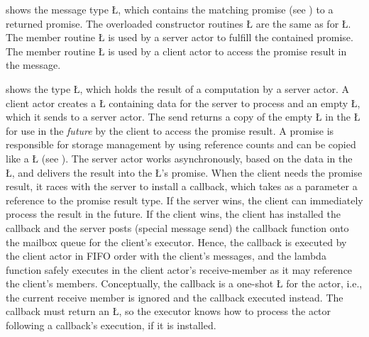 \documentclass[openright,twoside]{report}
\begin{document}
 shows the message type \LGinlinetrue\LGbegin\lgrinde\L{}\endlgrinde\LGend{}, which contains the matching promise (see ) to a returned promise.
The overloaded constructor routines \LGinlinetrue\LGbegin\lgrinde\L{}\endlgrinde\LGend{} are the same as for \LGinlinetrue\LGbegin\lgrinde\L{}\endlgrinde\LGend{}.
The member routine \LGinlinetrue\LGbegin\lgrinde\L{}\endlgrinde\LGend{} is used by a server actor to fulfill the contained promise.
The member routine \LGinlinetrue\LGbegin\lgrinde\L{}\endlgrinde\LGend{} is used by a client actor to access the promise result in the message.

 shows the type \LGinlinetrue\LGbegin\lgrinde\L{}\endlgrinde\LGend{}, which holds the result of a computation by a server actor.
A client actor creates a \LGinlinetrue\LGbegin\lgrinde\L{}\endlgrinde\LGend{} containing data for the server to process and an empty \LGinlinetrue\LGbegin\lgrinde\L{}\endlgrinde\LGend{}, which it sends to a server actor.
The send returns a copy of the empty \LGinlinetrue\LGbegin\lgrinde\L{}\endlgrinde\LGend{} in the \LGinlinetrue\LGbegin\lgrinde\L{}\endlgrinde\LGend{} for use in the \emph{future} by the client to access the promise result.
A promise is responsible for storage management by using reference counts and can be copied like a \LGinlinetrue\LGbegin\lgrinde\L{}\endlgrinde\LGend{} (see ).
The server actor works asynchronously, based on the data in the \LGinlinetrue\LGbegin\lgrinde\L{}\endlgrinde\LGend{}, and delivers the result into the \LGinlinetrue\LGbegin\lgrinde\L{}\endlgrinde\LGend{}'s promise.
When the client needs the promise result, it races with the server to install a callback, which takes as a parameter a reference to the promise result type.
If the server wins, the client can immediately process the result in the future.
If the client wins, the client has installed the callback and the server posts (special message send) the callback function onto the mailbox queue for the client's executor.
Hence, the callback is executed by the client actor in FIFO order with the client's messages, and the lambda function safely executes in the client actor's receive-member as it may reference the client's members.
Conceptually, the callback is a one-shot \LGinlinetrue\LGbegin\lgrinde\L{}\endlgrinde\LGend{} for the actor, i.e., the current receive member is ignored and the callback executed instead.
The callback must return an \LGinlinetrue\LGbegin\lgrinde\L{}\endlgrinde\LGend{}, so the executor knows how to process the actor following a callback's execution, if it is installed.
\end{document}
